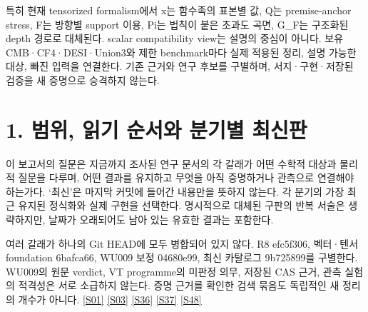 \documentclass[11pt,a4paper]{article}
\begin{document}
특히 현재 tensorized formalism에서 x는 함수족의 표본별 값, Q는 premise-anchor stress, F는 방향별 support 이용, Pi는 법칙이 붙은 초과도 곡면, G\_F는 구조화된 depth 경로로 대체된다. scalar compatibility view는 설명의 중심이 아니다. 보유 CMB·CF4·DESI·Union3와 제한 benchmark마다 실제 적용된 정리, 설명 가능한 대상, 빠진 입력을 연결한다. 기존 근거와 연구 후보를 구별하며, 서지·구현·저장된 검증을 새 증명으로 승격하지 않는다.


\hypertarget{s1}{}

\section*{1. 범위, 읽기 순서와 분기별 최신판}


이 보고서의 질문은 지금까지 조사된 연구 문서의 각 갈래가 어떤 수학적 대상과 물리적 질문을 다루며, 어떤 결과를 유지하고 무엇을 아직 증명하거나 관측으로 연결해야 하는가다. ‘최신’은 마지막 커밋에 들어간 내용만을 뜻하지 않는다. 각 분기의 가장 최근 유지된 정식화와 실제 구현을 선택한다. 명시적으로 대체된 구판의 반복 서술은 생략하지만, 날짜가 오래되어도 남아 있는 유효한 결과는 포함한다.


여러 갈래가 하나의 Git HEAD에 모두 병합되어 있지 않다. R8 efc5f306, 벡터·텐서 foundation 6bafca66, WU009 보정 04680e99, 최신 카탈로그 9b725899를 구별한다. WU009의 원문 verdict, VT programme의 미판정 의무, 저장된 CAS 근거, 관측 실험의 적격성은 서로 소급하지 않는다. 증명 근거를 확인한 검색 묶음도 독립적인 새 정리의 개수가 아니다. \hyperlink{src:S01}{[S01]} \hyperlink{src:S03}{[S03]} \hyperlink{src:S36}{[S36]} \hyperlink{src:S37}{[S37]} \hyperlink{src:S48}{[S48]}
\end{document}

